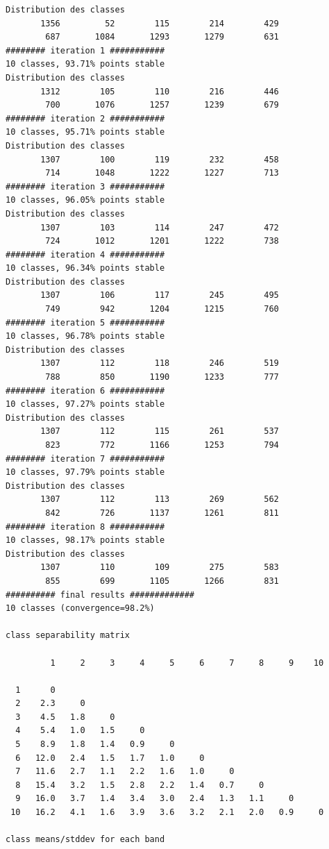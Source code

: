 \documentclass[environments,article,submit,pdftex,moreauthors]{Definitions/mdpi}
\begin{document}
\begin{scriptsize}
\begin{verbatim}
Distribution des classes
       1356         52        115        214        429
        687       1084       1293       1279        631
######## iteration 1 ###########
10 classes, 93.71% points stable
Distribution des classes
       1312        105        110        216        446
        700       1076       1257       1239        679
######## iteration 2 ###########
10 classes, 95.71% points stable
Distribution des classes
       1307        100        119        232        458
        714       1048       1222       1227        713
######## iteration 3 ###########
10 classes, 96.05% points stable
Distribution des classes
       1307        103        114        247        472
        724       1012       1201       1222        738
######## iteration 4 ###########
10 classes, 96.34% points stable
Distribution des classes
       1307        106        117        245        495
        749        942       1204       1215        760
######## iteration 5 ###########
10 classes, 96.78% points stable
Distribution des classes
       1307        112        118        246        519
        788        850       1190       1233        777
######## iteration 6 ###########
10 classes, 97.27% points stable
Distribution des classes
       1307        112        115        261        537
        823        772       1166       1253        794
######## iteration 7 ###########
10 classes, 97.79% points stable
Distribution des classes
       1307        112        113        269        562
        842        726       1137       1261        811
######## iteration 8 ###########
10 classes, 98.17% points stable
Distribution des classes
       1307        110        109        275        583
        855        699       1105       1266        831
########## final results #############
10 classes (convergence=98.2%)

class separability matrix

         1     2     3     4     5     6     7     8     9    10

  1      0
  2    2.3     0
  3    4.5   1.8     0
  4    5.4   1.0   1.5     0
  5    8.9   1.8   1.4   0.9     0
  6   12.0   2.4   1.5   1.7   1.0     0
  7   11.6   2.7   1.1   2.2   1.6   1.0     0
  8   15.4   3.2   1.5   2.8   2.2   1.4   0.7     0
  9   16.0   3.7   1.4   3.4   3.0   2.4   1.3   1.1     0
 10   16.2   4.1   1.6   3.9   3.6   3.2   2.1   2.0   0.9     0

class means/stddev for each band


\end{verbatim}
\end{scriptsize}
\end{document}
